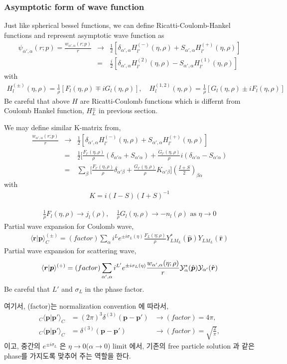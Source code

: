 \documentclass[10pt]{book}
\def\bm{\boldsymbol}
\newcommand{\bea}{\begin{eqnarray}}
\newcommand{\eea}{\end{eqnarray}}
\newcommand{\no}{\nonumber \\}
\def\vp{{\bm p}}
\def\vr{{\bm r}}
\def\la{\langle}
\def\ra{\rangle}
\begin{document}
\subsubsection{Asymptotic form of wave function}
Just like spherical bessel functions, we can define
Ricatti-Coulomb-Hankel functions 
and represent asymptotic wave 
function as
\bea
\psi_{\alpha',\alpha}(r;p)=\frac{w_{\alpha',\alpha}(r;p)}{r}
&\to& \frac{1}{2}[\delta_{\alpha',\alpha}H_{l'}^{(-)}(\eta,\rho)
           +S_{\alpha',\alpha} H_{l'}^{(+)}(\eta,\rho)]\no
&=&\frac{i}{2}[\delta_{\alpha',\alpha}H_{l'}^{(2)}(\eta,\rho)
           -S_{\alpha',\alpha} H_{l'}^{(1)}(\eta,\rho)]
\eea
with
\bea
H_{l}^{(\pm)}(\eta,\rho)=\frac{1}{\rho}[F_{l}(\eta,\rho)\mp i G_l(\eta,\rho)],
\quad
H_{l}^{(1,2)}(\eta,\rho)=\frac{1}{\rho}[G_l(\eta,\rho)\pm i F_l(\eta,\rho)]
\eea
Be careful that above $H$ are Ricatti-Coulomb functions
which is differnt from Coulomb Hankel function, $H_L^{\pm}$ in previous section.

We may define similar K-matrix from,
\bea 
\frac{w_{\alpha',\alpha}(r;p)}{r}& \to& \frac{1}{2}[\delta_{\alpha',\alpha}H_{l'}^{(-)}(\eta,\rho)
           +S_{\alpha',\alpha} H_{l'}^{(+)}(\eta,\rho)]\no
        &=&\frac{1}{2}[\frac{F_{l'}(\eta,\rho)}{\rho}(\delta_{\alpha'\alpha}+S_{\alpha'\alpha})
                      +\frac{G_{l'}(\eta,\rho)}{\rho}i(\delta_{\alpha'\alpha}-S_{\alpha'\alpha}) \no 
        &=&\sum_{\beta} \Big[\frac{F_{l'}(\eta,\rho)}{\rho}\delta_{\alpha'\beta}
                            +\frac{G_{l'}(\eta,\rho)}{\rho} K_{\alpha'\beta} \Big]
        (\frac{I+S}{2})_{\beta\alpha}
\eea 
with
\bea 
K=i (I-S)(I+S)^{-1} 
\eea 

\bea
\frac{1}{\rho}F_{l}(\eta,\rho)\to j_l(\rho),\quad
\frac{1}{\rho}G_l(\eta,\rho)\to -n_l(\rho) \mbox{ as } \eta\to 0
\eea
Partial wave expansion for Coulomb wave,
\bea
\la \vr|\vp\ra^{(\pm)}_C
=(factor)\sum_{\alpha} i^{L} e^{\pm i\sigma_L(\eta)}
         \frac{F_L(\eta;\rho)}{\rho}
         Y_{L M_L}^*(\hat{\vp}) Y_{L M_L}(\hat{\vr})
\eea
Partial wave expansion for scattering wave,
\bea
\la \vr|\vp\ra^{(+)}
=(factor)\sum_{\alpha',\alpha} i^{L'} e^{\pm i\sigma_L(\eta)}
         \frac{w_{\alpha',\alpha}(\eta;\rho)}{r}
         {\cal Y}_{\alpha}^*(\hat{\vp}) {\cal Y}_{\alpha'}(\hat{\vr})
\eea
Be careful that $L'$ and $\sigma_L$ in the phase factor.

여기서, (factor)는 normalization convention 에 따라서,
\begin{equation}
\begin{array}{lll}
{}_C\la \vp|\vp'\ra_C &=(2\pi)^3\delta^{(3)}(\vp-\vp') &\to (factor)=4\pi,\no
{}_C\la \vp|\vp'\ra_C &=\delta^{(3)}(\vp-\vp') &\to (factor)=\sqrt{\frac{2}{\pi}},
\end{array}
\end{equation}
이고, 중간의 $e^{\pm i\sigma_L}$ 은 $\eta\to 0$($\alpha\to 0$) limit 에서,
기존의 free particle solution 과 같은 phase를 가지도록 맞추어 주는 역할을 한다.
\end{document}
